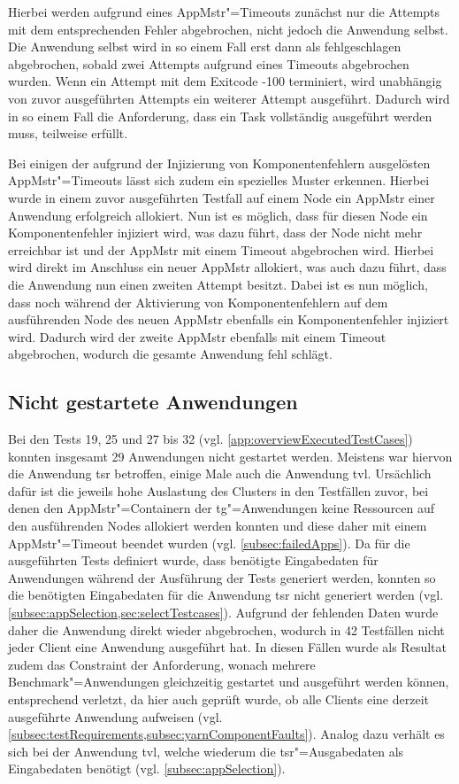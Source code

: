 Hierbei werden aufgrund eines \gls{AppMstr}"=Timeouts zunächst nur die Attempts mit dem entsprechenden Fehler abgebrochen, nicht jedoch die Anwendung selbst.
Die Anwendung selbst wird in so einem Fall erst dann als fehlgeschlagen abgebrochen, sobald zwei Attempts aufgrund eines Timeouts abgebrochen wurden.
Wenn ein Attempt mit dem Exitcode -100 terminiert, wird unabhängig von zuvor ausgeführten Attempts ein weiterer Attempt ausgeführt.
Dadurch wird in so einem Fall die Anforderung, dass ein Task vollständig ausgeführt werden muss, teilweise erfüllt.

Bei einigen der aufgrund der Injizierung von Komponentenfehlern ausgelösten \gls{AppMstr}"=Timeouts lässt sich zudem ein spezielles Muster erkennen.
Hierbei wurde in einem zuvor ausgeführten Testfall auf einem Node ein \gls{AppMstr} einer Anwendung erfolgreich allokiert.
Nun ist es möglich, dass für diesen Node ein Komponentenfehler injiziert wird, was dazu führt, dass der Node nicht mehr erreichbar ist und der \gls{AppMstr} mit einem Timeout abgebrochen wird.
Hierbei wird direkt im Anschluss ein neuer \gls{AppMstr} allokiert, was auch dazu führt, dass die Anwendung nun einen zweiten Attempt besitzt.
Dabei ist es nun möglich, dass noch während der Aktivierung von Komponentenfehlern auf dem ausführenden Node des neuen \gls{AppMstr} ebenfalls ein Komponentenfehler injiziert wird.
Dadurch wird der zweite \gls{AppMstr} ebenfalls mit einem Timeout abgebrochen, wodurch die gesamte Anwendung fehl schlägt.

\subsection{Nicht gestartete Anwendungen}
\label{subsec:notStartedApps}

Bei den Tests 19, 25 und 27 bis 32  (vgl. \cref{app:overviewExecutedTestCases}) konnten insgesamt 29 Anwendungen nicht gestartet werden.
Meistens war hiervon die Anwendung \acrlong{tsr} betroffen, einige Male auch die Anwendung \acrlong{tvl}.
Ursächlich dafür ist die jeweils hohe Auslastung des Clusters in den Testfällen zuvor, bei denen den \gls{AppMstr}"=Containern der \acrlong{tg}"=Anwendungen keine Ressourcen auf den ausführenden Nodes allokiert werden konnten und diese daher mit einem \gls{AppMstr}"=Timeout beendet wurden (vgl. \cref{subsec:failedApps}).
Da für die ausgeführten Tests definiert wurde, dass benötigte Eingabedaten für Anwendungen während der Ausführung der Tests generiert werden, konnten so die benötigten Eingabedaten für die Anwendung \acrlong{tsr} nicht generiert werden (vgl. \cref{subsec:appSelection,sec:selectTestcases}).
Aufgrund der fehlenden Daten wurde daher die Anwendung direkt wieder abgebrochen, wodurch in 42 Testfällen nicht jeder Client eine Anwendung ausgeführt hat.
In diesen Fällen wurde als Resultat zudem das Constraint der Anforderung, wonach mehrere Benchmark"=Anwendungen gleichzeitig gestartet und ausgeführt werden können, entsprechend verletzt, da hier auch geprüft wurde, ob alle Clients eine derzeit ausgeführte Anwendung aufweisen (vgl. \cref{subsec:testRequirements,subsec:yarnComponentFaults}).
Analog dazu verhält es sich bei der Anwendung \acrlong{tvl}, welche wiederum die \acrlong{tsr}"=Ausgabedaten als Eingabedaten benötigt (vgl. \cref{subsec:appSelection}).


